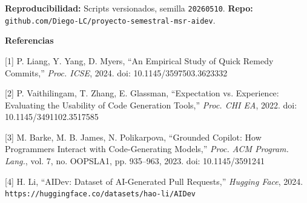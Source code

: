 \documentclass[final,t]{beamer}
\newcommand{\articleblock}[2]{%
  {\color{paperAccent}\LARGE\bfseries #1}\par
  \vspace{0.05cm}{\color{paperRule}\hrule height 1.0pt}\vspace{0.08cm}
  {#2}\par\vspace{0.08cm}
}
\begin{document}
\begin{frame}[t]
\begin{center}
\begin{minipage}{0.94\textwidth}
{\vspace{0.08cm}
{\footnotesize\textbf{Reproducibilidad:} Scripts versionados, semilla \texttt{20260510}. \textbf{Repo:} \texttt{github.com/Diego-LC/proyecto-semestral-msr-aidev}.}
}

\articleblock{Referencias}{
\footnotesize
[1] P. Liang, Y. Yang, D. Myers, ``An Empirical Study of Quick Remedy Commits,'' \textit{Proc. ICSE}, 2024. doi: 10.1145/3597503.3623332

[2] P. Vaithilingam, T. Zhang, E. Glassman, ``Expectation vs. Experience: Evaluating the Usability of Code Generation Tools,'' \textit{Proc. CHI EA}, 2022. doi: 10.1145/3491102.3517585

[3] M. Barke, M. B. James, N. Polikarpova, ``Grounded Copilot: How Programmers Interact with Code-Generating Models,'' \textit{Proc. ACM Program. Lang.}, vol. 7, no. OOPSLA1, pp. 935--963, 2023. doi: 10.1145/3591241

[4] H. Li, ``AIDev: Dataset of AI-Generated Pull Requests,'' \textit{Hugging Face}, 2024. \texttt{https://huggingface.co/datasets/hao-li/AIDev}
}

\end{minipage}
\end{center}

\end{frame}
\end{document}

